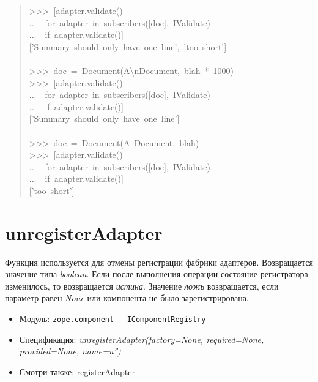 \documentclass[14pt,a4paper,openany,twoside,final]{extbook}
\providecommand*{\DUroletitlereference}[1]{\textsl{#1}}
\begin{document}
\begin{quote}
{>{}>{}>~{[}adapter.validate()\\
...~~for~adapter~in~subscribers({[}doc{]},~IValidate)\\
...~~if~adapter.validate(){]}\\
{[}'Summary~should~only~have~one~line',~'too~short'{]}\\
~\\
>{}>{}>~doc~=~Document(\textquotedbl{}A\textbackslash{}nDocument\textquotedbl{},~\textquotedbl{}blah\textquotedbl{}~*~1000)\\
>{}>{}>~{[}adapter.validate()\\
...~~for~adapter~in~subscribers({[}doc{]},~IValidate)\\
...~~if~adapter.validate(){]}\\
{[}'Summary~should~only~have~one~line'{]}\\
~\\
>{}>{}>~doc~=~Document(\textquotedbl{}A~Document\textquotedbl{},~\textquotedbl{}blah\textquotedbl{})\\
>{}>{}>~{[}adapter.validate()\\
...~~for~adapter~in~subscribers({[}doc{]},~IValidate)\\
...~~if~adapter.validate(){]}\\
{[}'too~short'{]}
}
\end{quote}


\section*{unregisterAdapter%
  \label{unregisteradapter}%
}

Функция используется для отмены регистрации фабрики адаптеров.
Возвращается значение типа \DUroletitlereference{boolean}.  Если после выполнения операции
состояние регистратора изменилось, то возвращается \DUroletitlereference{истина}.  Значение
\DUroletitlereference{ложь} возвращается, если параметр равен \DUroletitlereference{None} или компонента не было
зарегистрирована.

\begin{itemize}

\item Модуль: \texttt{zope.component - IComponentRegistry}

\item Спецификация: \DUroletitlereference{unregisterAdapter(factory=None, required=None,
provided=None, name=u'')}

\item Смотри также: \hyperref[registeradapter]{registerAdapter}

\end{itemize}
\end{document}
